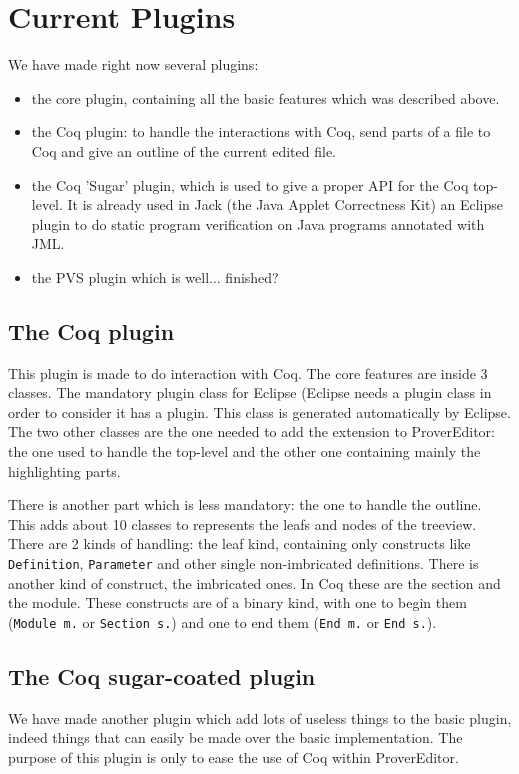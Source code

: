 \documentclass{entcs}
\begin{document}
\section{Current Plugins}

We have made right now several plugins:
\begin{itemize}
\item the core plugin, containing all the basic features which was described above.
\item the Coq plugin: to handle the interactions with Coq, send parts of a file to Coq
and give an outline of the current edited file.
\item the Coq 'Sugar' plugin, which is used to give a proper API for the Coq top-level.
It is already used in Jack \cite{Jack-Web} (the Java Applet Correctness Kit) an Eclipse plugin
to do static program verification on Java programs annotated with JML.

\item the PVS plugin which is well... finished?
\end{itemize}
\subsection{The Coq plugin}
This plugin is made to do interaction with Coq. The core features
are inside 3 classes. The mandatory plugin class for Eclipse (Eclipse
needs a plugin class in order to consider it has a plugin. This class
is generated automatically by Eclipse. The two other classes are the one
needed to add the extension to ProverEditor: the one used to handle the
top-level and the other one containing mainly the highlighting parts.

There is another part which is less mandatory: the one to handle the outline.
This adds about 10 classes to represents the leafs and nodes of the treeview.
There are 2 kinds of handling: the leaf kind, containing only constructs
like {\tt Definition}, {\tt Parameter} and other single non-imbricated
definitions. There is another kind of construct, the imbricated ones.
In Coq these are the section and the module. These constructs are of
a binary kind, with one to begin them ({\tt Module m.} or {\tt Section s.})
and one to end them ({\tt End m.} or {\tt End s.}).

\subsection{The Coq sugar-coated plugin}
We have made another plugin which add lots of useless things to the basic plugin,
indeed things that can easily be made over the basic implementation.
The purpose of this plugin is only to ease the use of Coq within ProverEditor.
\end{document}
